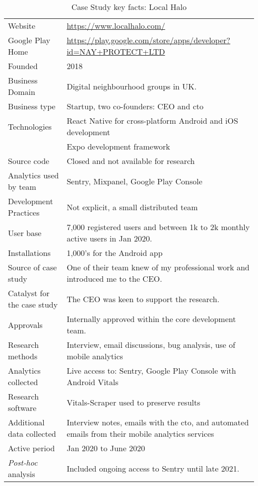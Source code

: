 \begin{table*}
    \renewcommand{\arraystretch}{0.8}%
    \centering
    \small
    \setlength{\tabcolsep}{6pt}
    \begin{tabular}{lp{11cm}}
       \toprule
       Website &\url{https://www.localhalo.com/} \\
       Google Play Home & \url{https://play.google.com/store/apps/developer?id=NAY+PROTECT+LTD} \\
       Founded &2018 \\
       Business Domain &Digital neighbourhood groups in UK.\\
       Business type &Startup, two co-founders: CEO and \acrshort{cto} \\
       Technologies  &React Native for cross-platform Android and iOS development \\
       &Expo development framework \\
       Source code  &Closed and not available for research \\
       Analytics used by team &Sentry, Mixpanel, Google Play Console \\
       Development Practices &Not explicit, a small distributed team \\
       \midrule
       User base &7,000 registered users and between 1k to 2k monthly active users in Jan 2020. \\
       Installations &1,000's for the Android app \\
       \midrule
       Source of case study &One of their team knew of my professional work and introduced me to the CEO. \\
       Catalyst for the case study &The CEO was keen to support the research. \\
       Approvals &Internally approved within the core development team. \\
       \midrule
       Research methods &Interview, email discussions, bug analysis, use of mobile analytics \\
       Analytics collected &Live access to: Sentry, Google Play Console with Android Vitals \\
       Research software &Vitals-Scraper used to preserve results \\
       Additional data collected &Interview notes, emails with the \acrshort{cto}, and automated emails from their mobile analytics services \\
       Active period &Jan 2020 to June 2020 \\
       \midrule
       \emph{Post-hoc} analysis &Included ongoing access to Sentry until late 2021. \\
       \bottomrule
    \end{tabular}
    \caption{Case Study key facts: Local Halo}
    \label{tab:local_halo_anaytics_overview}
\end{table*}

